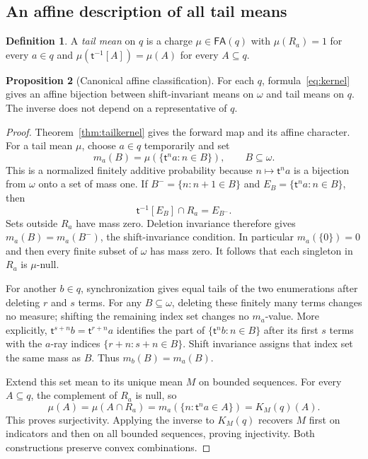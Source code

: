 \documentclass[11pt,letterpaper]{article}
\theoremstyle{definition}
\newtheorem{definition}{Definition}[section]
\newtheorem{proposition}[definition]{Proposition}
\newcommand{\FA}{\mathsf{FA}}
\newcommand{\tail}{\mathsf t}
\begin{document}
\subsection{An affine description of all tail means}

\begin{definition}
A \emph{tail mean} on $q$ is a charge $\mu\in\FA(q)$ with $\mu(R_a)=1$ for every $a\in q$ and $\mu(\tail^{-1}[A])=\mu(A)$ for every $A\subseteq q$.
\end{definition}

\begin{proposition}[Canonical affine classification]\label{prop:classify}
For each $q$, formula~\eqref{eq:kernel} gives an affine bijection between shift-invariant means on $\omega$ and tail means on $q$. The inverse does not depend on a representative of $q$.
\end{proposition}

\begin{proof}
Theorem~\ref{thm:tailkernel} gives the forward map and its affine character. For a tail mean $\mu$, choose $a\in q$ temporarily and set
\[
 m_a(B)=\mu(\{\tail^n a:n\in B\}),\qquad B\subseteq\omega.
\]
This is a normalized finitely additive probability because $n\mapsto\tail^n a$ is a bijection from $\omega$ onto a set of mass one. If $B^- =\{n:n+1\in B\}$ and $E_B=\{\tail^n a:n\in B\}$, then
\[
 \tail^{-1}[E_B]\cap R_a=E_{B^-}.
\]
Sets outside $R_a$ have mass zero. Deletion invariance therefore gives $m_a(B)=m_a(B^-)$, the shift-invariance condition. In particular $m_a(\{0\})=0$ and then every finite subset of $\omega$ has mass zero. It follows that each singleton in $R_a$ is $\mu$-null.

For another $b\in q$, synchronization gives equal tails of the two enumerations after deleting $r$ and $s$ terms. For any $B\subseteq\omega$, deleting these finitely many terms changes no measure; shifting the remaining index set changes no $m_a$-value. More explicitly, $\tail^{s+n}b=\tail^{r+n}a$ identifies the part of $\{\tail^n b:n\in B\}$ after its first $s$ terms with the $a$-ray indices $\{r+n:s+n\in B\}$. Shift invariance assigns that index set the same mass as $B$. Thus $m_b(B)=m_a(B)$.

Extend this set mean to its unique mean $M$ on bounded sequences. For every $A\subseteq q$, the complement of $R_a$ is null, so
\[
 \mu(A)=\mu(A\cap R_a)
       =m_a(\{n:\tail^n a\in A\})=K_M(q)(A).
\]
This proves surjectivity. Applying the inverse to $K_M(q)$ recovers $M$ first on indicators and then on all bounded sequences, proving injectivity. Both constructions preserve convex combinations.
\end{proof}
\end{document}
